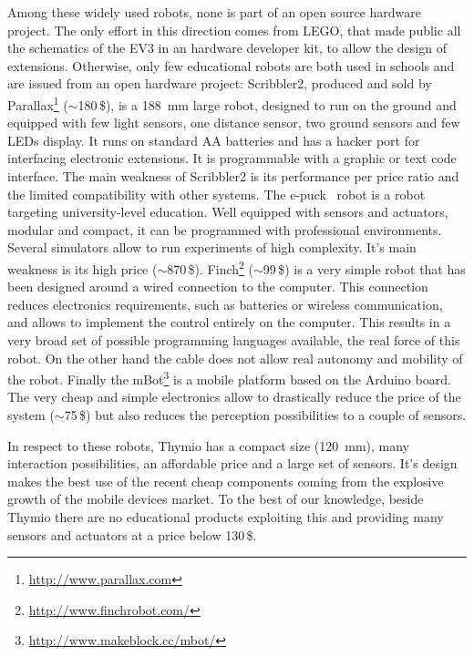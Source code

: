 \documentclass[letterpaper, 10 pt, conference]{ieeeconf}  %
\begin{document}
Among these widely used robots, none is part of an open source hardware project.
The only effort in this direction comes from LEGO, that made public all the schematics of the EV3 in an hardware developer kit, to allow the design of extensions. 
Otherwise, only few educational robots are both used in schools and are issued from an open hardware project:
Scribbler2, produced and sold by Parallax\footnote{\url{http://www.parallax.com}} ($\sim$180\,\$), is a 188~mm large robot, designed to run on the ground and equipped with few light sensors, one distance sensor, two ground sensors and few LEDs display.
It runs on standard AA batteries and has a hacker port for interfacing electronic extensions.
It is programmable with a graphic or text code interface.  
The main weakness of Scribbler2 is its performance per price ratio and the limited compatibility with other systems. 
The e-puck~\cite{mondada2009puck} robot is a robot targeting university-level education.
Well equipped with sensors and actuators, modular and compact, it can be programmed with professional environments.
Several simulators allow to run experiments of high complexity. 
It's main weakness is its high price ($\sim$870\,\$).
Finch\footnote{\url{http://www.finchrobot.com/}} ($\sim$99\,\$) is a very simple robot that has been designed around a wired connection to the computer. 
This connection reduces electronics requirements, such as batteries or wireless communication, and allows to implement the control entirely on the computer.
This results in a very broad set of possible programming languages available, the real force of this robot. 
On the other hand the cable does not allow real autonomy and mobility of the robot.
Finally the mBot\footnote{\url{http://www.makeblock.cc/mbot/}} is a mobile platform based on the Arduino board. 
The very cheap and simple electronics allow to drastically reduce the price of the system ($\sim$75\,\$) but also reduces the perception possibilities to a couple of sensors. 

In respect to these robots, Thymio has a compact size (120~mm), many interaction possibilities, an affordable price and a large set of sensors.
It's design makes the best use of the recent cheap components coming from the explosive growth of the mobile devices market. 
To the best of our knowledge, beside Thymio there are no educational products exploiting this and providing many sensors and actuators at a price below 130\,\$.
\end{document}
